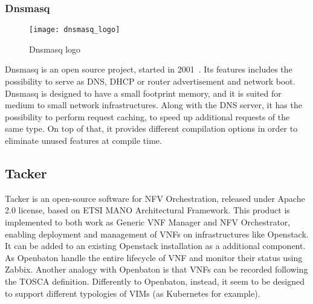 \subsubsection{Dnsmasq}
\begin{figure}[h]
  \centering \texttt{[image: dnsmasq\_logo]}
  \caption{Dnsmasq logo}
  \label{chap:prjan:img:dnsmasq_logo}
\end{figure}
Dnsmasq is an open source project, started in 2001~\cite{dnsmasqweb}. Its
features includes the possibility to serve as DNS, DHCP or router advertisement
and network boot. Dnsmasq is designed to have a small footprint memory, and it
is suited for medium to small network infrastructures. Along with the DNS
server, it has the possibility to perform request caching, to speed up
additional requests of the same type. On top of that, it provides different
compilation options in order to eliminate unused features at compile time.

\subsection{Tacker}
Tacker is an open-source software for NFV Orchestration, released under Apache
2.0 license, based on ETSI MANO Architectural Framework. This product is
implemented to both work as Generic VNF Manager and NFV Orchestrator, enabling
deployment and management of VNFs on infrastructures like Openstack. It can be
added to an existing Openstack installation as a additional component. As
Openbaton handle the entire lifecycle of VNF and monitor their status using
Zabbix. Another analogy with Openbaton is that VNFs can be recorded following
the TOSCA definition. Differently to Openbaton, instead, it seem to be designed
to support different typologies of VIMs (as Kubernetes for example). 
